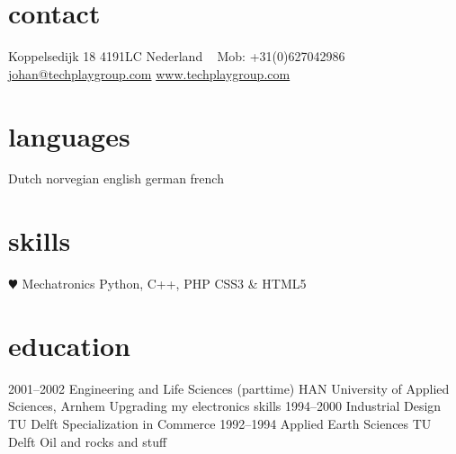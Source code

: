 \documentclass[]{friggeri-cv} %
\begin{document}

\begin{aside} %
\section{contact}
Koppelsedijk 18
4191LC
Nederland
~
Mob: +31(0)627042986
~
\href{mailto:johan@techplaygroup.com}{johan@techplaygroup.com}
\href{http://www.techplaygroup.com}{www.techplaygroup.com}
\section{languages}
Dutch
norvegian
english
german
french
\section{skills}
{\color{red} $\varheartsuit$} Mechatronics
Python, C++, PHP
CSS3 \& HTML5
\end{aside}


\section{education}



\begin{entrylist}
\entry
{2001--2002}
{Engineering and Life Sciences {\normalfont (parttime)}}
{HAN University of Applied Sciences, Arnhem}
{Upgrading my electronics skills}
\entry
{1994--2000}
{Industrial Design}
{TU Delft}
{Specialization in Commerce}
\entry
{1992--1994}
{Applied Earth Sciences}
{TU Delft}
{Oil and rocks and stuff}
\end{entrylist}
\end{document}

